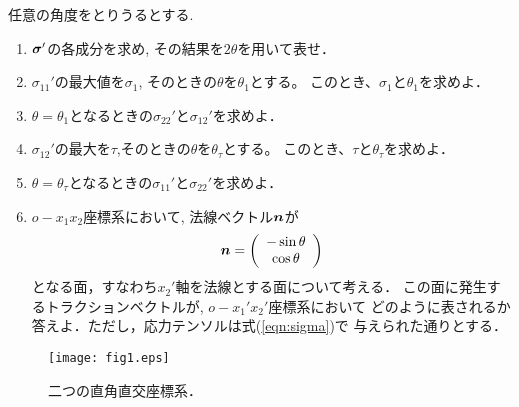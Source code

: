 \documentclass[10pt,a4j]{jarticle}
\begin{document}
任意の角度をとりうるとする.
\begin{enumerate}
\item
	$\mbox{\boldmath $\sigma$}'$の各成分を求め, その結果を$2\theta$を用いて表せ．
\item
	$\sigma_{11}'$の最大値を$\sigma_1$, そのときの$\theta$を$\theta_1$とする。
	このとき、$\sigma_1$と$\theta_1$を求めよ．
\item
	$\theta=\theta_1$となるときの$\sigma_{22}'$と$\sigma_{12}'$を求めよ．
\item
	$\sigma_{12}'$の最大を$\tau$,そのときの$\theta$を$\theta_\tau$とする。
	このとき、$\tau$と$\theta_\tau$を求めよ．
\item
	$\theta=\theta_\tau$となるときの$\sigma_{11}'$と$\sigma_{22}'$を求めよ．
\item
	$o-x_1x_2$座標系において, 法線ベクトル$\mbox{\boldmath $n$}$が
	\[
		\mbox{\boldmath $n$}=\left( 
		\begin{array}{c}
			-\sin \theta \\
			\cos \theta
		\end{array}
		\right)
	\]
	となる面，すなわち$x_2'$軸を法線とする面について考える．
	この面に発生するトラクションベクトルが, $o-x_1'x_2'$座標系において
	どのように表されるか答えよ．ただし，応力テンソルは式(\ref{eqn:sigma})で
	与えられた通りとする．
\end{enumerate}
\begin{figure}[h]
	\begin{center}
	\texttt{[image: fig1.eps]} 
	\end{center}
	\vspace{-5mm}
	\caption{二つの直角直交座標系．} 
	\label{fig:fig1}
\end{figure}
\end{document}
